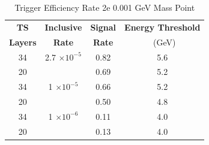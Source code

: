 \begin{table}
 \centering
\caption{Trigger Efficiency Rate 2e 0.001 GeV Mass Point}
\begin{tabular}{ c | c | c | c }
\textbf{TS} & \textbf{Inclusive} & \textbf{Signal} & \textbf{Energy Threshold}  \\ \textbf{Layers} & \textbf{Rate} & \textbf{Rate} & \ (GeV) \\ 
\hline
34 & 2.7 $\times 10^{-5}$ & 0.82 & 5.6 \\ 
20 & & 0.69 & 5.2 \\ 
\hline 
34 & 1 $\times 10^{-5}$ & 0.66 & 5.2 \\ 
20 & & 0.50 & 4.8 \\ 
\hline 
34 & 1 $\times 10^{-6}$ & 0.11 & 4.0 \\ 
20 & & 0.13 & 4.0 \\ 
\hline 
\end{tabular}
\end{table}
